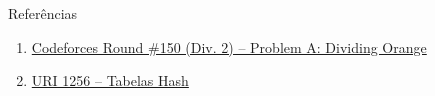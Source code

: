 \begin{frame}[fragile]{Referências}

    \begin{enumerate}
        \item \href{https://codeforces.com/problemset/problem/244/A}{Codeforces Round \#150 (Div. 2) -- Problem A: Dividing Orange}

        \item \href{https://www.urionlinejudge.com.br/judge/pt/problems/view/1256}{URI 1256 -- Tabelas Hash}


    \end{enumerate}

\end{frame}
